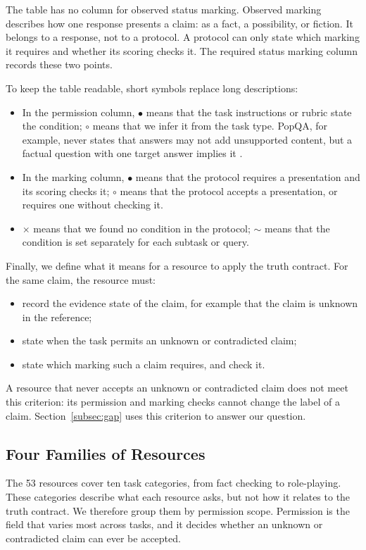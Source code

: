\documentclass{clv2025}
\newcommand{\Stated}{\ensuremath{\bullet}}
\newcommand{\Weak}{\ensuremath{\circ}}
\newcommand{\Varies}{\ensuremath{\sim}}
\newcommand{\Lacks}{\ensuremath{\times}}
\begin{document}
The table has no column for observed status marking. Observed marking
describes how one response presents a claim: as a fact, a possibility, or
fiction. It belongs to a response, not to a protocol. A protocol can only
state which marking it requires and whether its scoring checks it.
The required status marking column records these two points.

To keep the table readable, short symbols replace long descriptions:
\begin{itemize}
\item In the permission column, \Stated{} means that the task instructions
or rubric state the condition; \Weak{} means that we infer it from the task
type. PopQA, for example, never states that answers may not add unsupported
content, but a factual question with one target answer implies it
\citep{mallen_when_2023}.
\item In the marking column, \Stated{} means that the protocol requires a
presentation and its scoring checks it; \Weak{} means that the protocol
accepts a presentation, or requires one without checking it.
\item \Lacks{} means that we found no condition in the protocol; \Varies{}
means that the condition is set separately for each subtask or query.
\end{itemize}

Finally, we define what it means for a resource to apply the truth
contract. For the same claim, the resource must:
\begin{itemize}
\item record the evidence state of the claim, for example that the claim is
unknown in the reference;
\item state when the task permits an unknown or contradicted claim;
\item state which marking such a claim requires, and check it.
\end{itemize}
A resource that never accepts an unknown or contradicted claim does not
meet this criterion: its permission and marking checks cannot change the
label of a claim. Section~\ref{subsec:gap} uses this criterion to answer
our question.

\subsection{Four Families of Resources}\label{subsec:families}

The 53 resources cover ten task categories, from fact checking to
role-playing. These categories describe what each resource asks, but not
how it relates to the truth contract. We therefore group them by
permission scope. Permission is the field that varies most across tasks,
and it decides whether an unknown or contradicted claim can ever be
accepted.
\end{document}
